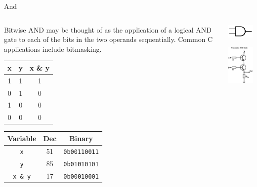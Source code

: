 \documentclass[11pt]{beamer}
\begin{document}
\begin{frame}{And}
\begin{columns}
\begin{column}{0.7\textwidth}
Bitwise AND may be thought of as the application of a logical AND gate to each of the bits in the two operands sequentially. Common C applications include bitmasking.   
\center
\begin{tabular}{| c | c | c |}
\hline
x & y & x \& y \\ \hline
1 & 1 & 1 \\ \hline
0 & 1 & 0 \\ \hline
1 & 0 & 0 \\ \hline
0 & 0 & 0 \\ \hline
\end{tabular}

\begin{tabular}{| c | c | c |}
\hline
Variable & Dec & Binary \\ \hline
\texttt{x} & 51 & \texttt{0b00110011} \\ \hline
\texttt{y} & 85 & \texttt{0b01010101} \\ \hline
\texttt{x \& y} & 17 & \texttt{0b00010001} \\ \hline
\end{tabular}

\end{column}
\begin{column}{0.3\textwidth}
\center
\includegraphics[scale=0.5]{andgate.png}

\includegraphics[scale=0.8]{TransistorANDgate.png}
\end{column}
\end{columns}
\end{frame}
\end{document}
